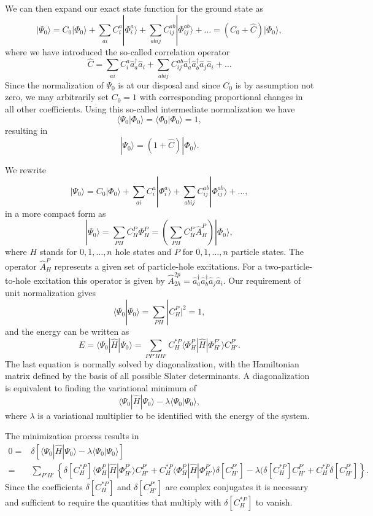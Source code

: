   We can then expand our exact state function for the ground state as
  \[
  |\Psi_0\rangle=C_0|\Phi_0\rangle+\sum_{ai}C_i^a|\Phi_i^a\rangle+\sum_{abij}C_{ij}^{ab}|\Phi_{ij}^{ab}\rangle+\dots
  =(C_0+\hat{C})|\Phi_0\rangle,
  \]
  where we have introduced the so-called correlation operator
  \[
  \hat{C}=\sum_{ai}C_i^a\hat{a}_{a}^{\dagger}\hat{a}_i
  +\sum_{abij}C_{ij}^{ab}\hat{a}_{a}^{\dagger}\hat{a}_{b}^{\dagger}\hat{a}_j\hat{a}_i+\dots
  \]
  Since the normalization of $\Psi_0$ is at our disposal and since
  $C_0$ is by assumption not zero, we may arbitrarily set $C_0=1$ with
  corresponding proportional changes in all other coefficients. Using
  this so-called intermediate normalization we have
  \[
  \langle \Psi_0 | \Phi_0 \rangle = \langle \Phi_0 | \Phi_0 \rangle =
  1,
  \]
  resulting in
  \[
  |\Psi_0\rangle=(1+\hat{C})|\Phi_0\rangle.
  \]


  We rewrite
  \[
  |\Psi_0\rangle=C_0|\Phi_0\rangle+\sum_{ai}C_i^a|\Phi_i^a\rangle+\sum_{abij}C_{ij}^{ab}|\Phi_{ij}^{ab}\rangle+\dots,
  \]
  in a more compact form as
  \[
  |\Psi_0\rangle=\sum_{PH}C_H^P\Phi_H^P=\left(\sum_{PH}C_H^P\hat{A}_H^P\right)|\Phi_0\rangle,
  \]
  where $H$ stands for $0,1,\dots,n$ hole states and $P$ for
  $0,1,\dots,n$ particle states. The operator $\hat{A}_H^P$ represents
  a given set of particle-hole excitations. For a two-particle-to-hole
  excitation this operator is given by
  $\hat{A}_{2h}^{2p}=\hat{a}_{a}^{\dagger}\hat{a}_{b}^{\dagger}\hat{a}_j\hat{a}_i$.
  Our requirement of unit normalization gives
  \[
  \langle \Psi_0 | \Psi_0 \rangle = \sum_{PH}|C_H^P|^2= 1,
  \]
  and the energy can be written as
  \[
  E= \langle \Psi_0 | \hat{H} |\Psi_0 \rangle=
  \sum_{PP'HH'}C_H^{*P}\langle \Phi_H^P | \hat{H} |\Phi_{H'}^{P'}
  \rangle C_{H'}^{P'}.
  \]
  The last equation is normally solved by diagonalization, with the
  Hamiltonian matrix defined by the basis of all possible Slater
  determinants. A diagonalization is equivalent to finding the
  variational minimum of
  \[
   \langle \Psi_0 | \hat{H} |\Psi_0 \rangle-\lambda \langle \Psi_0
   |\Psi_0 \rangle,
  \]
  where $\lambda$ is a variational multiplier to be identified with
  the energy of the system.

  The minimization process results in
  \begin{align}
  0=&\delta\left[ \langle \Psi_0 | \hat{H} |\Psi_0 \rangle-\lambda
    \langle \Psi_0 |\Psi_0 \rangle\right]\\
  =& \sum_{P'H'}\left\{\delta[C_H^{*P}]\langle \Phi_H^P | \hat{H}
  |\Phi_{H'}^{P'} \rangle C_{H'}^{P'}+ C_H^{*P}\langle \Phi_H^P |
  \hat{H} |\Phi_{H'}^{P'} \rangle \delta[C_{H'}^{P'}]- \lambda(
  \delta[C_H^{*P}]C_{H'}^{P'}+C_H^{*P}\delta[C_{H'}^{P'}]\right\}.
  \end{align}
  Since the coefficients $\delta[C_H^{*P}]$ and $\delta[C_{H'}^{P'}]$
  are complex conjugates it is necessary and sufficient to require the
  quantities that multiply with $\delta[C_H^{*P}]$ to vanish.


